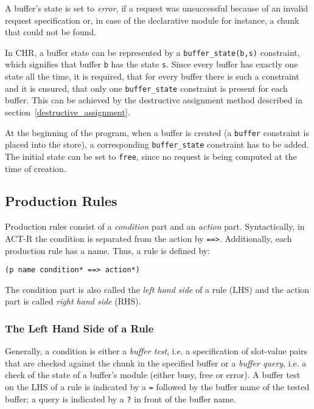 A buffer's state is set to \emph{error}, if a request was unsuccessful because of an invalid request specification or, in case of the declarative module for instance, a chunk that could not be found.

In CHR, a buffer state can be represented by a \verb|buffer_state(b,s)| constraint, which signifies that buffer \verb|b| has the state \verb|s|. Since every buffer has exactly one state all the time, it is required, that for every buffer there is such a constraint and it is ensured, that only one \verb|buffer_state| constraint is present for each buffer. This can be achieved by the destructive assignment method described in section~\ref{destructive_assignment}. 

At the beginning of the program, when a buffer is created (a \verb|buffer| constraint is placed into the store), a corresponding \verb|buffer_state| constraint has to be added. The initial state can be set to \verb|free|, since no request is being computed at the time of creation.

\subsection{Production Rules}

Production rules consist of a \emph{condition} part and an \emph{action} part. Syntactically, in ACT-R the condition is separated from the action by \verb|==>|. Additionally, each production rule has a name. Thus, a rule is defined by:

\begin{verbatim}
(p name condition* ==> action*)
\end{verbatim}

The condition part is also called the \emph{left hand side} of a rule (LHS) and the action part is called \emph{right hand side} (RHS).

\subsubsection{The Left Hand Side of a Rule}

Generally, a condition is either a \emph{buffer test}, i.e. a specification of slot-value pairs that are checked against the chunk in the specified buffer or a \emph{buffer query}, i.e. a check of the state of a buffer's module (either busy, free or error). A buffer test on the LHS of a rule is indicated by a \verb|=| followed by the buffer name of the tested buffer; a query is indicated by a \verb|?| in front of the buffer name.

